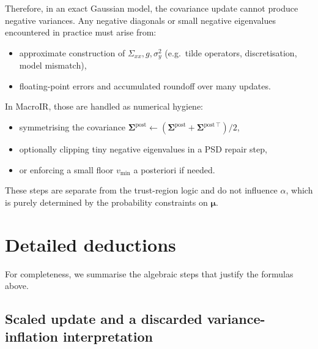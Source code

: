 \documentclass[11pt]{article}
\begin{document}
Therefore, in an exact Gaussian model, the covariance update cannot produce
negative variances.  Any negative diagonals or small negative eigenvalues
encountered in practice must arise from:
\begin{itemize}
  \item approximate construction of \(\Sigma_{xx}, g, \sigma_y^2\)
        (e.g.\ tilde operators, discretisation, model mismatch),
  \item floating-point errors and accumulated roundoff over many updates.
\end{itemize}

In MacroIR, those are handled as numerical hygiene:
\begin{itemize}
  \item symmetrising the covariance 
        \(\boldsymbol{\Sigma}^{\text{post}}
          \leftarrow (\boldsymbol{\Sigma}^{\text{post}}
          + \boldsymbol{\Sigma}^{\text{post}\,\top})/2\),
  \item optionally clipping tiny negative eigenvalues in a PSD repair step,
  \item or enforcing a small floor \(v_{\min}\) a posteriori if needed.
\end{itemize}
These steps are separate from the trust-region logic and do not influence
\(\alpha\), which is purely determined by the probability constraints on
\(\boldsymbol{\mu}\).


\section{Detailed deductions}
\label{sec:detailed-deductions}

For completeness, we summarise the algebraic steps that justify the formulas
above.

\subsection{Scaled update and a discarded variance-inflation interpretation}
\label{subsec:scaled-update-equivalence}
\end{document}
